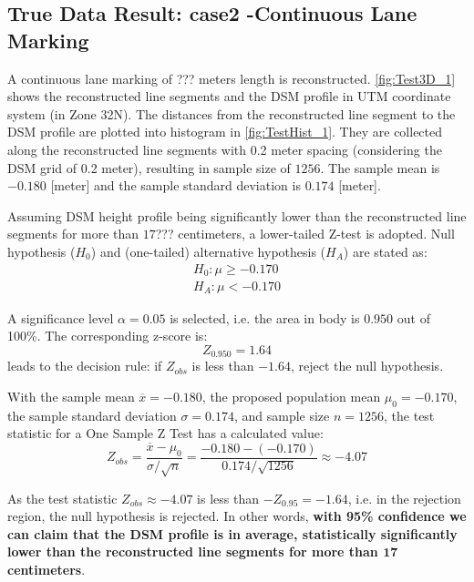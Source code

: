 \subsection{True Data Result: case2 -Continuous Lane Marking}
\label{subsec:trueresult-2}

A continuous lane marking of ??? meters length is reconstructed. \cref{fig:Test3D_1} shows the reconstructed line segments and the DSM profile in UTM coordinate system (in Zone 32N). The distances from the reconstructed line segment to the DSM profile are plotted into histogram in \cref{fig:TestHist_1}. They are collected along the reconstructed line segments with 0.2 meter spacing (considering the DSM grid of 0.2 meter), resulting in sample size of $1256$. The sample mean is $-0.180$ [meter] and the sample standard deviation is $0.174$ [meter]. %

Assuming DSM height profile being significantly lower than the reconstructed line segments for more than $17$??? centimeters, a lower-tailed Z-test is adopted. Null hypothesis ($H_0$) and (one-tailed) alternative hypothesis ($H_A$) are stated as:
\begin{equation*}
\begin{split}
H_0: \mu\geq-0.170\\
H_A: \mu<-0.170
\end{split}
\end{equation*}

A significance level $\alpha=0.05$ is selected, i.e. the area in body is $0.950$ out of 100\%. The corresponding z-score is:
\begin{equation*}
Z_{0.950}=1.64
\end{equation*}
leads to the decision rule: if $Z_{obs}$ is less than $-1.64$, reject the null hypothesis.

With the sample mean $\overline{x}=-0.180$,
the proposed population mean $\mu_0=-0.170$,
the sample standard deviation $\sigma=0.174$,
and sample size $n=1256$, the test statistic for a One Sample Z Test has a calculated value:
\begin{equation*}
Z_{obs} = \frac{\overline{x}-\mu_0}{\sigma/\sqrt{n}}=\frac{-0.180-(-0.170)}{0.174/\sqrt{1256}}\approx-4.07
\end{equation*}

As the test statistic $Z_{obs}\approx-4.07$ is less than $-Z_{0.95}=-1.64$, i.e. in the rejection region, the null hypothesis is rejected. In other words, \textbf{with 95\% confidence we can claim that the DSM profile is in average, statistically significantly lower than the reconstructed line segments for more than $\mathbf{17}$ centimeters}. %

